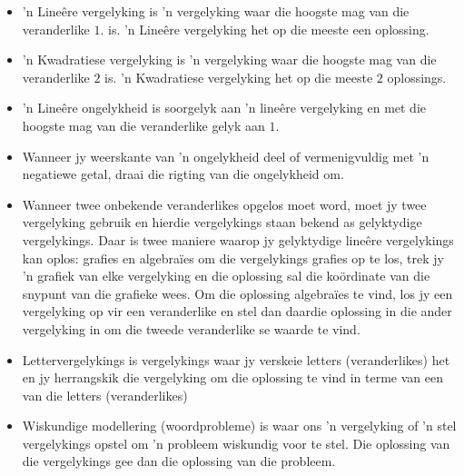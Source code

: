 \begin{itemize}[noitemsep]
\item ’n Lineêre vergelyking is ’n vergelyking waar die hoogste mag van die veranderlike $1$. is. ’n Lineêre vergelyking het op die meeste een oplossing.
\item ’n Kwadratiese vergelyking is ’n vergelyking waar die hoogste mag van die veranderlike $2$ is. ’n Kwadratiese
vergelyking het op die meeste $2$ oplossings.
\item ’n Lineêre ongelykheid is soorgelyk aan ’n lineêre vergelyking en met die hoogste mag van die veranderlike
gelyk aan $1$.
\item Wanneer jy weerskante van ’n ongelykheid deel of vermenigvuldig met ’n negatiewe getal,
draai die rigting van die ongelykheid om. 
\item Wanneer twee onbekende veranderlikes opgelos moet word, moet jy twee vergelyking gebruik en hierdie vergelykings staan bekend as gelyktydige vergelykings. Daar is twee maniere waarop jy gelyktydige lineêre
vergelykings kan oplos: grafies en algebraïes om die vergelykings grafies op te los, trek jy ’n grafiek
van elke vergelyking en die oplossing sal die koördinate van die snypunt van die grafieke wees. Om die
oplossing algebraïes te vind, los jy een vergelyking op vir een veranderlike en stel dan daardie oplossing
in die ander vergelyking in om die tweede veranderlike se waarde te vind.
\item Lettervergelykings is vergelykings waar jy verskeie letters (veranderlikes) het en jy herrangskik die vergelyking om die oplossing te vind in terme van een van die letters (veranderlikes)
\item Wiskundige modellering (woordprobleme) is waar ons ’n vergelyking of ’n stel vergelykings opstel om ’n probleem wiskundig
voor te stel. Die oplossing van die vergelykings gee dan die oplossing van die probleem.
\end{itemize}

